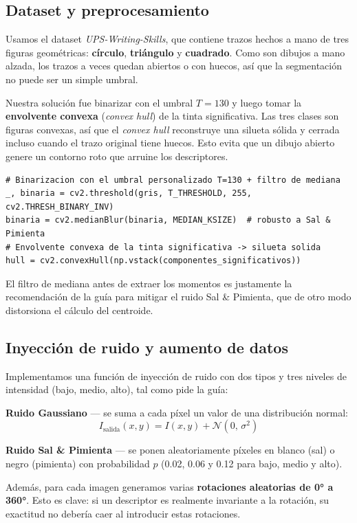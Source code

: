 \documentclass[12pt,a4paper]{article}
\begin{document}
\subsection{Dataset y preprocesamiento}

Usamos el dataset \textit{UPS-Writing-Skills}, que contiene trazos hechos a mano de tres figuras geométricas: \textbf{círculo}, \textbf{triángulo} y \textbf{cuadrado}. Como son dibujos a mano alzada, los trazos a veces quedan abiertos o con huecos, así que la segmentación no puede ser un simple umbral.

Nuestra solución fue binarizar con el umbral $T=130$ y luego tomar la \textbf{envolvente convexa} (\textit{convex hull}) de la tinta significativa. Las tres clases son figuras convexas, así que el \textit{convex hull} reconstruye una silueta sólida y cerrada incluso cuando el trazo original tiene huecos. Esto evita que un dibujo abierto genere un contorno roto que arruine los descriptores.

\begin{lstlisting}
# Binarizacion con el umbral personalizado T=130 + filtro de mediana
_, binaria = cv2.threshold(gris, T_THRESHOLD, 255, cv2.THRESH_BINARY_INV)
binaria = cv2.medianBlur(binaria, MEDIAN_KSIZE)  # robusto a Sal & Pimienta
# Envolvente convexa de la tinta significativa -> silueta solida
hull = cv2.convexHull(np.vstack(componentes_significativos))
\end{lstlisting}

El filtro de mediana antes de extraer los momentos es justamente la recomendación de la guía para mitigar el ruido Sal \& Pimienta, que de otro modo distorsiona el cálculo del centroide.

\subsection{Inyección de ruido y aumento de datos}

Implementamos una función de inyección de ruido con dos tipos y tres niveles de intensidad (bajo, medio, alto), tal como pide la guía:

\textbf{Ruido Gaussiano} — se suma a cada píxel un valor de una distribución normal:
\[
I_{\text{salida}}(x,y) = I(x,y) + \mathcal{N}(0,\,\sigma^2)
\]

\textbf{Ruido Sal \& Pimienta} — se ponen aleatoriamente píxeles en blanco (sal) o negro (pimienta) con probabilidad $p$ (0.02, 0.06 y 0.12 para bajo, medio y alto).

Además, para cada imagen generamos varias \textbf{rotaciones aleatorias de 0° a 360°}. Esto es clave: si un descriptor es realmente invariante a la rotación, su exactitud no debería caer al introducir estas rotaciones.
\end{document}
